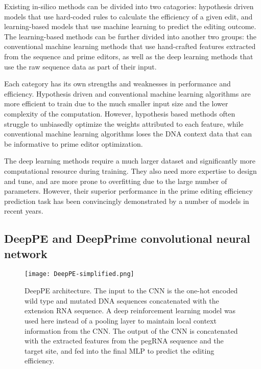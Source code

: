 Existing in-silico methods can be divided into two catagories: hypothesis driven models that use hard-coded rules to calculate the efficiency of a given edit\cite{hsuPrimeDesignSoftwareRapid2021,hwangPEDesignerPEAnalyzerWebbased2021}, and learning-based models that use machine learning to predict the editing outcome. 
The learning-based methods can be further divided into another two groups: the conventional machine learning methods that use hand-crafted features extracted from the sequence and prime editors\cite{liEasyPrimeMachineLearning2021,koeppelPredictionPrimeEditing2023}, as well as the deep learning methods that use the raw sequence data as part of their input\cite{yuPredictionEfficienciesDiverse2023,kimPredictingEfficiencyPrime2021, mathisPredictingPrimeEditing2023}. 

Each category has its own strengths and weaknesses in performance and efficiency. Hypothesis driven and conventional machine learning algorithms are more efficient to train due to the much smaller input size and the lower complexity of the computation. However, hypothesis based methods often struggle to unbiasedly optimize the weights attributed to each feature\cite{liEasyPrimeMachineLearning2021}, while conventional machine learning algorithms loses the DNA context data that can be informative to prime editor optimization. 

The deep learning methods require a much larger dataset and significantly more computational resource during training. They also need more expertise to design and tune, and are more prone to overfitting due to the large number of parameters. However, their superior performance in the prime editing efficiency prediction task has been convincingly demonstrated by a number of models in recent years.


\subsection{DeepPE and DeepPrime convolutional neural network}


\begin{figure}
    \centering
    \texttt{[image: DeepPE-simplified.png]}
    \caption[DeepPE architecture]{DeepPE architecture. The input to the CNN is the one-hot encoded wild type and mutated DNA sequences concatenated with the extension RNA sequence. A deep reinforcement learning model was used here instead of a pooling layer to maintain local context information from the CNN. The output of the CNN is concatenated with the extracted features from the pegRNA sequence and the target site, and fed into the final MLP to predict the editing efficiency. }
    \label{fig:deeppe}
\end{figure}


